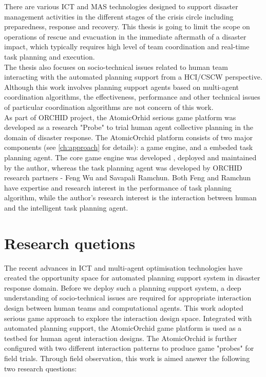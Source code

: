 There are various ICT and MAS technologies designed to support disaster management activities in the different stages of the crisis circle including preparedness, response and recovery. This thesis is going to limit the scope on operations of rescue and evacuation in the immediate aftermath of a disaster impact, which typically requires high level of team coordination and real-time task planning and execution.\\ 

The thesis also focuses on socio-technical issues related to human team interacting with the automated planning support from a HCI/CSCW perspective. Although this work involves planning support agents based on multi-agent coordination algorithms, the effectiveness, performance and other technical issues of particular coordination algorithms are not concern of this work.\\

As part of ORCHID project, the AtomicOrhid serious game platform was developed as a research "Probe" to trial human agent collective planning in the domain of disaster response. The AtomicOrchid platform consists of two major components (see \ref{ch:approach} for details): a game engine, and a embeded task planning agent. The core game engine was developed , deployed and maintained by the author, whereas the task planning agent was developed by ORCHID research partners - Feng Wu and Savapali Ramchun. Both Feng and Ramchun have expertise and research interest in the performance of task planning algorithm, while the author's research interest is the interaction between human and the intelligent task planning agent. \\

\section{Research quetions}
The recent advances in ICT and multi-agent optimisation technologies have created the opportunity space for automated planning support system in disaster response domain. Before we deploy such a planning support system, a deep understanding of socio-technical issues are required for appropriate interaction design between human teams and computational agents. This work adopted serious game approach to explore the interaction design space. Integrated with automated planning support, the AtomicOrchid game platform is used as a testbed for human agent interaction designs.  The AtomicOrchid is further configured with two different interaction patterns to produce game "probes" for field trials. Through field observation, this work is aimed answer the following two research questions:

